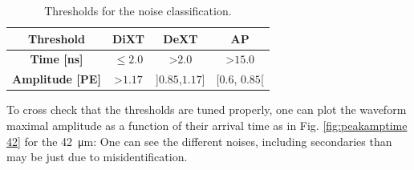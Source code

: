 \begin{table}[htbp]
\centering
\begin{tabular}{|c|c|c|c|}
\hline
\textbf{Threshold}      & \textbf{DiXT} & \textbf{DeXT}   & \textbf{AP}     \\ \hline
\textbf{Time [ns]}      & $\leq2.0$     & >$2.0$          & >$15.0$         \\ \hline
\textbf{Amplitude [PE]} & >$1.17$       & ]$ 0.85 $,$ 1.17 $] & [$ 0.6 $, $ 0.85 $[ \\ \hline
\end{tabular}
\caption{Thresholds for the noise classification.}
\label{table:thresholds wa}
\end{table}

To cross check that the thresholds are tuned properly, one can plot the waveform maximal amplitude as a function of their arrival time as in Fig. \ref{fig:peakamptime 42} for the \SI{42}{\micro m}: One can see the different noises, including secondaries than may be just due to misidentification.

